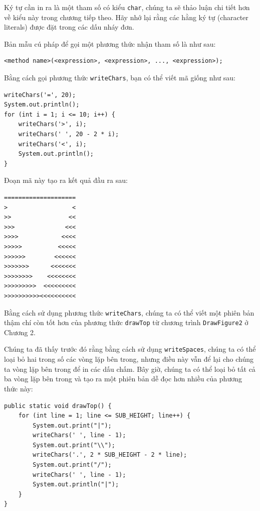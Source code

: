 Ký tự cần in ra là một tham số có kiểu \texttt{char}, chúng ta sẽ thảo
luận chi tiết hơn về kiểu này trong chương tiếp theo. Hãy nhớ lại rằng
các hằng ký tự (character literals) được đặt trong các dấu nháy đơn.

Bản mẫu cú pháp để gọi một phương thức nhận tham số là như sau:

\begin{verbatim}
<method name>(<expression>, <expression>, ..., <expression>);
\end{verbatim}

Bằng cách gọi phương thức \texttt{writeChars}, bạn có thể viết mã giống
như sau:

\begin{verbatim}
writeChars('=', 20);
System.out.println();
for (int i = 1; i <= 10; i++) {
    writeChars('>', i);
    writeChars(' ', 20 - 2 * i);
    writeChars('<', i);
    System.out.println();
}
\end{verbatim}

Đoạn mã này tạo ra kết quả đầu ra sau:

\begin{verbatim}
==================== 
>                  < 
>>                << 
>>>              <<< 
>>>>            <<<< 
>>>>>          <<<<< 
>>>>>>        <<<<<< 
>>>>>>>      <<<<<<< 
>>>>>>>>    <<<<<<<< 
>>>>>>>>>  <<<<<<<<< 
>>>>>>>>>><<<<<<<<<<
\end{verbatim}

Bằng cách sử dụng phương thức \texttt{writeChars}, chúng ta có thể viết
một phiên bản thậm chí còn tốt hơn của phương thức \texttt{drawTop} từ
chương trình \texttt{DrawFigure2} ở Chương 2.

Chúng ta đã thấy trước đó rằng bằng cách sử dụng \texttt{writeSpaces},
chúng ta có thể loại bỏ hai trong số các vòng lặp bên trong, nhưng điều
này vẫn để lại cho chúng ta vòng lặp bên trong để in các dấu chấm. Bây
giờ, chúng ta có thể loại bỏ tất cả ba vòng lặp bên trong và tạo ra một
phiên bản dễ đọc hơn nhiều của phương thức này:

\begin{verbatim}
public static void drawTop() {
    for (int line = 1; line <= SUB_HEIGHT; line++) {
        System.out.print("|");
        writeChars(' ', line - 1);
        System.out.print("\\");
        writeChars('.', 2 * SUB_HEIGHT - 2 * line);
        System.out.print("/");
        writeChars(' ', line - 1);
        System.out.println("|");
    }
}
\end{verbatim}

